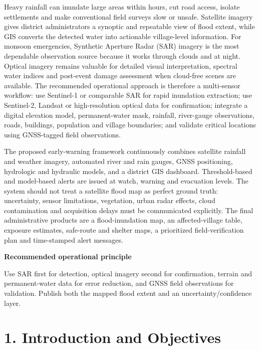 \documentclass[11pt,a4paper]{article}
\begin{document}
Heavy rainfall can inundate large areas within hours, cut road access, isolate settlements and make conventional field surveys slow or unsafe. Satellite imagery gives district administrators a synoptic and repeatable view of flood extent, while GIS converts the detected water into actionable village-level information. For monsoon emergencies, Synthetic Aperture Radar (SAR) imagery is the most dependable observation source because it works through clouds and at night. Optical imagery remains valuable for detailed visual interpretation, spectral water indices and post-event damage assessment when cloud-free scenes are available. The recommended operational approach is therefore a multi-sensor workflow: use Sentinel-1 or comparable SAR for rapid inundation extraction; use Sentinel-2, Landsat or high-resolution optical data for confirmation; integrate a digital elevation model, permanent-water mask, rainfall, river-gauge observations, roads, buildings, population and village boundaries; and validate critical locations using GNSS-tagged field observations.

The proposed early-warning framework continuously combines satellite rainfall and weather imagery, automated river and rain gauges, GNSS positioning, hydrologic and hydraulic models, and a district GIS dashboard. Threshold-based and model-based alerts are issued at watch, warning and evacuation levels. The system should not treat a satellite flood map as perfect ground truth: uncertainty, sensor limitations, vegetation, urban radar effects, cloud contamination and acquisition delays must be communicated explicitly. The final administrative products are a flood-inundation map, an affected-village table, exposure estimates, safe-route and shelter maps, a prioritized field-verification plan and time-stamped alert messages.

\begin{summarybox}
{\sffamily\bfseries\color{Primary}Recommended operational principle}\par
Use SAR first for detection, optical imagery second for confirmation, terrain and permanent-water data for error reduction, and GNSS field observations for validation. Publish both the mapped flood extent and an uncertainty/confidence layer.
\end{summarybox}

\section{1. Introduction and Objectives}\label{introduction-and-objectives}
\end{document}
